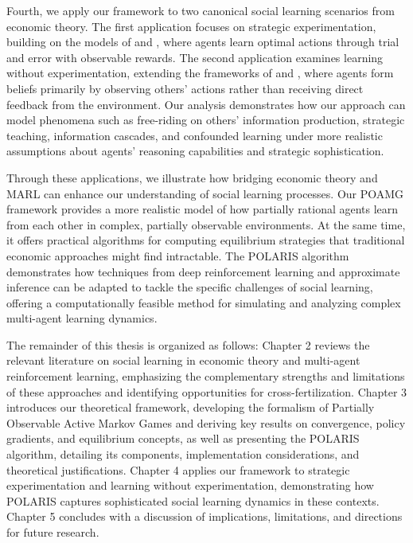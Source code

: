 Fourth, we apply our framework to two canonical social learning scenarios from economic theory. The first application focuses on strategic experimentation, building on the models of \citet{bolton1999strategic} and \citet{keller2020undiscounted}, where agents learn optimal actions through trial and error with observable rewards. The second application examines learning without experimentation, extending the frameworks of \citet{huang2024learning} and \citet{brandl2024}, where agents form beliefs primarily by observing others' actions rather than receiving direct feedback from the environment. Our analysis demonstrates how our approach can model phenomena such as free-riding on others' information production, strategic teaching, information cascades, and confounded learning under more realistic assumptions about agents' reasoning capabilities and strategic sophistication.

Through these applications, we illustrate how bridging economic theory and MARL can enhance our understanding of social learning processes. Our POAMG framework provides a more realistic model of how partially rational agents learn from each other in complex, partially observable environments. At the same time, it offers practical algorithms for computing equilibrium strategies that traditional economic approaches might find intractable. The POLARIS algorithm demonstrates how techniques from deep reinforcement learning and approximate inference can be adapted to tackle the specific challenges of social learning, offering a computationally feasible method for simulating and analyzing complex multi-agent learning dynamics.

The remainder of this thesis is organized as follows: Chapter 2 reviews the relevant literature on social learning in economic theory and multi-agent reinforcement learning, emphasizing the complementary strengths and limitations of these approaches and identifying opportunities for cross-fertilization. Chapter 3 introduces our theoretical framework, developing the formalism of Partially Observable Active Markov Games and deriving key results on convergence, policy gradients, and equilibrium concepts, as well as presenting the POLARIS algorithm, detailing its components, implementation considerations, and theoretical justifications. Chapter 4 applies our framework to strategic experimentation and learning without experimentation, demonstrating how POLARIS captures sophisticated social learning dynamics in these contexts. Chapter 5 concludes with a discussion of implications, limitations, and directions for future research.

